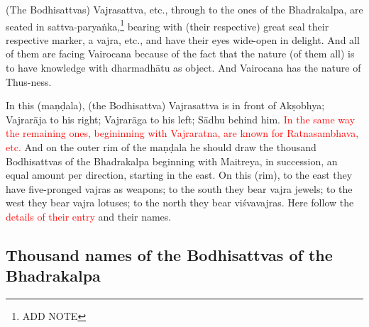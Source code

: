 \documentclass[11pt]{book}
\newcommand{\red}[1]{\textcolor{red}{#1}}
\begin{document}
(The Bodhisattvas) Vajrasattva, etc., through to the ones of the Bhadrakalpa, are seated in sattva-paryaṅka,\footnote{ADD NOTE} bearing with (their respective) great seal their respective marker, a vajra, etc., and have their eyes wide-open in delight. And all of them are facing Vairocana because of the fact that the nature (of them all) is to have knowledge with dharmadhātu as object. And Vairocana has the nature of Thus-ness.

In this (maṇḍala), (the Bodhisattva) Vajrasattva is in front of Akṣobhya; Vajrarāja to his right; Vajrarāga to his left; Sādhu behind him. \red{In the same way the remaining ones, begininning with Vajraratna, are known for Ratnasambhava, etc.} And on the outer rim of the maṇḍala he should draw the thousand Bodhisattvas of the Bhadrakalpa beginning with Maitreya, in succession, an equal amount per direction, starting in the east. On this (rim), to the east they have five-pronged vajras as weapons; to the south they bear vajra jewels; to the west they bear vajra lotuses; to the north they bear viśvavajras. Here follow the \red{details of their entry} and their names.

\subsection{Thousand names of the Bodhisattvas of the Bhadrakalpa}
\end{document}
